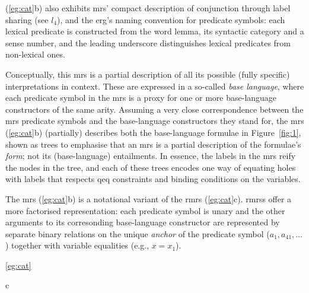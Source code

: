 (\ref{eg:cat}b) also exhibits {\sc mrs}' compact description of
conjunction through label sharing (see $l_4$), and the {\sc
  erg}'s naming convention for predicate symbols: each lexical predicate is
constructed from the word lemma, its syntactic category and a sense
number, and the leading underscore distinguishes lexical predicates
from non-lexical ones.

Conceptually, this {\sc mrs} is a partial description of all its
possible (fully specific) interpretations in context.  
These are expressed in a so-called {\em base language}, where each
predicate symbol in the {\sc mrs} is a proxy for one or more
base-language constructors of the same arity.
Assuming a very close
correspondence between the {\sc mrs} predicate symbols and the
base-language constructors they 
stand for, the {\sc mrs}
(\ref{eg:cat}b) (partially) describes both the base-language formulae in
Figure~\ref{fig:1}, shown as trees to emphasise that an {\sc mrs} is a
partial description of the formulae's {\em form}; not its
(base-language) entailments. 
In essence, the labels in the {\sc mrs} reify the
nodes in the tree, and each of these trees encodes one way of equating
holes with labels that respects qeq constraints and binding conditions
on the variables.


The {\sc mrs} (\ref{eg:cat}b) is a notational variant of the {\sc
  rmrs} (\ref{eg:cat}c). {\sc rmrs}s offer a more factorised
representation: each predicate symbol is unary and the other
arguments to its corresonding base-language constructor
are represented by separate binary relations on the unique {\em
  anchor} of the predicate symbol ($a_1, a_{41},\ldots$) together with
variable equalities (e.g., $x=x_1$).
\begin{examples}
\item   [\ref{eg:cat}]
\begin{subexamples}
\item   [c]

\end{subexamples}
\end{examples}

